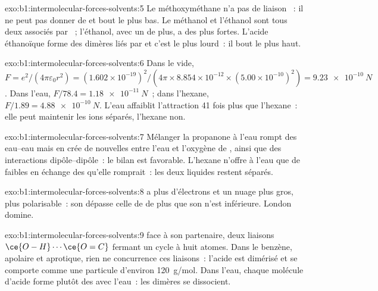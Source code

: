 \begin{solution}{exo:b1:intermolecular-forces-solvents:5}
Le méthoxyméthane n'a pas de liaison ~: il ne peut pas donner de
 et bout le plus bas. Le méthanol et l'éthanol sont tous
deux associés par ~; l'éthanol, avec un  de
plus, a des  plus fortes. L'acide éthanoïque forme
des dimères liés par  et c'est le plus lourd~: il bout
le plus haut.
\end{solution}

\begin{solution}{exo:b1:intermolecular-forces-solvents:6}
Dans le vide, $F = e^2/(4\pi\varepsilon_0 r^2) = (1.602 \times
10^{-19})^2/(4\pi \times 8.854 \times 10^{-12} \times (5.00 \times
10^{-10})^2) = \qty{9.23e-10}{N}$. Dans l'eau, $F/78.4 = \qty{1.18e-11}{N}$~;
dans l'hexane, $F/1.89 = \qty{4.88e-10}{N}$. L'eau affaiblit l'attraction
41 fois plus que l'hexane~: elle peut maintenir les ions séparés,
l'hexane non.
\end{solution}

\begin{solution}{exo:b1:intermolecular-forces-solvents:7}
Mélanger la propanone à l'eau rompt des  eau--eau mais
en crée de nouvelles entre l'eau et l'oxygène de , ainsi que des
interactions dipôle--dipôle~: le bilan est favorable. L'hexane n'offre à
l'eau que de faibles  en échange des  qu'elle romprait~: les deux liquides restent séparés.
\end{solution}

\begin{solution}{exo:b1:intermolecular-forces-solvents:8}
 a plus d'électrons et un nuage plus gros, plus polarisable~:
son  dépasse celle de  de plus que son
 n'est inférieure. London domine.
\end{solution}

\begin{solution}{exo:b1:intermolecular-forces-solvents:9}
 face à son partenaire, deux
liaisons $\ce{O-H}\cdots\ce{O=C}$ fermant un cycle à huit atomes. Dans le
benzène, apolaire et aprotique, rien ne concurrence ces liaisons~: l'acide
est dimérisé et se comporte comme une particule d'environ
\qty{120}{g/mol}. Dans l'eau, chaque molécule d'acide forme plutôt des
 avec l'eau~: les dimères se dissocient.
\end{solution}

